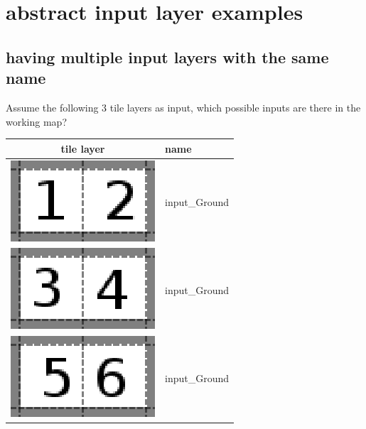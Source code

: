 \newpage
\section{abstract input layer examples}
\subsection{having multiple input layers with the same name}
Assume the following 3 tile layers as input, which possible inputs are there in the working map?
\begin{table}[h!]
        \begin{tabular}{|c|l|}
        \hline
		tile layer & name \\
        \hline
        \hline
		\includegraphics[scale=1]{Example/AbstractInput/12.eps} & input\_Ground \\
		\hline
		\includegraphics[scale=1]{Example/AbstractInput/34.eps} & input\_Ground\\
		\hline
		\includegraphics[scale=1]{Example/AbstractInput/56.eps} & input\_Ground\\
		\hline
		\end{tabular}
\end{table}

